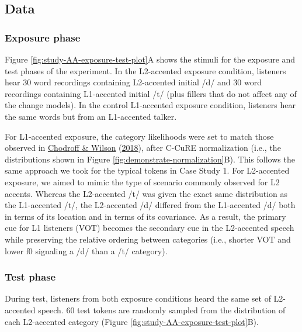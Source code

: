\documentclass[
  11pt,
  english,
  man,floatsintext]{apa6}
\begin{document}
\hypertarget{data-1}{%
\subsection{Data}\label{data-1}}

\hypertarget{exposure-phase-1}{%
\subsubsection{Exposure phase}\label{exposure-phase-1}}

Figure \ref{fig:study-AA-exposure-test-plot}A shows the stimuli for the exposure and test phases of the experiment. In the L2-accented exposure condition, listeners hear 30 word recordings containing L2-accented initial /d/ and 30 word recordings containing L1-accented initial /t/ (plus fillers that do not affect any of the change models). In the control L1-accented exposure condition, listeners hear the same words but from an L1-accented talker.

For L1-accented exposure, the category likelihoods were set to match those observed in \protect\hyperlink{ref-chodroff-wilson2018}{Chodroff \& Wilson} (\protect\hyperlink{ref-chodroff-wilson2018}{2018}), after C-CuRE normalization (i.e., the distributions shown in Figure \ref{fig:demonstrate-normalization}B). This follows the same approach we took for the typical tokens in Case Study 1. For L2-accented exposure, we aimed to mimic the type of scenario commonly observed for L2 accents. Whereas the L2-accented /t/ was given the exact same distribution as the L1-accented /t/, the L2-accented /d/ differed from the L1-accented /d/ both in terms of its location and in terms of its covariance. As a result, the primary cue for L1 listeners (VOT) becomes the secondary cue in the L2-accented speech while preserving the relative ordering between categories (i.e., shorter VOT and lower f0 signaling a /d/ than a /t/ category).

\hypertarget{test-phase-1}{%
\subsubsection{Test phase}\label{test-phase-1}}

During test, listeners from both exposure conditions heard the same set of L2-accented speech. 60 test tokens are randomly sampled from the distribution of each L2-accented category (Figure \ref{fig:study-AA-exposure-test-plot}B).
\end{document}
